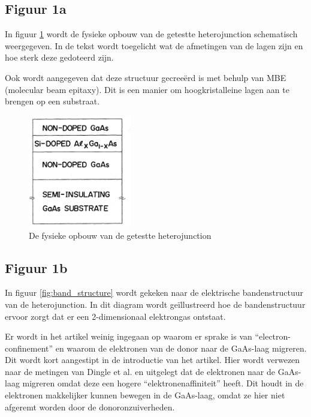\documentclass[11pt]{article}
\begin{document}
\subsection{Figuur 1a}
In figuur \ref{fig:phsyical_structure} wordt de fysieke opbouw van de getestte heterojunction schematisch weergegeven. In de tekst wordt toegelicht wat de afmetingen van de lagen zijn en hoe sterk deze gedoteerd zijn.

Ook wordt aangegeven dat deze structuur gecree\"erd is met behulp van MBE (molecular beam epitaxy). Dit is een manier om hoogkristalleine lagen aan te brengen op een substraat.

\begin{figure}[h]
  \begin{center}
    \includegraphics[width=0.4\textwidth]{physical_structure.png}
    \caption{De fysieke opbouw van de getestte heterojunction}
    \label{fig:phsyical_structure}
  \end{center}
\end{figure}

\subsection{Figuur 1b}
In figuur \ref{fig:band_structure} wordt gekeken naar de elektrische bandenstructuur van de heterojunction. In dit diagram wordt ge\"illustreerd hoe de bandenstructuur ervoor zorgt dat er een 2-dimensionaal elektrongas ontstaat. 

Er wordt in het artikel weinig ingegaan op waarom er sprake is van ``electron-confinement'' en waarom de elektronen van de donor naar de GaAs-laag migreren. Dit wordt kort aangestipt in de introductie van het artikel. Hier wordt verwezen naar de metingen van Dingle et al. en uitgelegt dat de elektronen naar de GaAs-laag migreren omdat deze een hogere ``elektronenaffiniteit'' heeft. Dit houdt in de elektronen makkelijker kunnen bewegen in de GaAs-laag, omdat ze hier niet afgeremt worden door de donoronzuiverheden.
\end{document}
